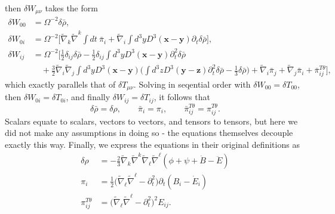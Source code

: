 \documentclass[10pt,letterpaper]{article}
\begin{document}
then $\delta W_{\mu\nu}$ takes the form
\begin{align}
\delta W_{00}  &= \Omega^{-2} \delta \bar \rho,
\nonumber\\	
\delta W_{0i} &= \Omega^{-2} \bigg[ \tilde\nabla_k \tilde\nabla^k \int dt\  \bar \pi_i  + \tilde\nabla_i  \int d^3y D^3(\mathbf x-\mathbf y) \partial_t \delta \bar\rho\bigg],
\nonumber\\	
\delta W_{ij}  &= \Omega^{-2}\bigg[ 
\frac12 \delta_{ij} \delta\bar \rho - \frac12 \delta_{ij} \int d^3y D^3(\mathbf x-\mathbf y) \partial_t^2 \delta \bar \rho \nonumber\\
&\quad +\frac32 \tilde\nabla_i\tilde\nabla_j \int d^3y D^3(\mathbf x-\mathbf y) \bigg( \int d^3z D^3(\mathbf y-\mathbf z) \partial_t^2 \delta \bar \rho - \frac13\delta\bar\rho\bigg)
+ \tilde\nabla_i \bar\pi_j + \tilde\nabla_j \bar\pi_i + \bar\pi_{ij}^{T\theta}\bigg],
\end{align}
which exactly parallels that of $\delta T_{\mu\nu}$. Solving in seqential order with $\delta W_{00} = \delta T_{00}$, then $\delta W_{0i} = \delta T_{0i}$, and finally $\delta W_{ij} = \delta T_{ij}$, it follows that
\begin{equation}
	\delta \bar \rho  = \delta \rho,\qquad \bar \pi_i = \pi_i,\qquad \bar \pi_{ij}^{T\theta} = \pi_{ij}^{T\theta}.
\end{equation}
Scalars equate to scalars, vectors to vectors, and tensors to tensors, but here we did not make any assumptions in doing so - the equations themselves decouple exactly this way. Finally, we express the equations in their original definitions as
\begin{align}
\delta \rho &=  -\frac{2}{3}\tilde{\nabla}_k\tilde{\nabla}^k\tilde{\nabla}_{\ell}\tilde{\nabla}^\ell(\phi + \psi +\dot{B}-\ddot{E})\nonumber\\
\pi_i &=  \frac12\big( \tilde\nabla_\ell \tilde\nabla^\ell - \partial_t^2\big) \partial_t (B_i - \dot{E}_i)\nonumber\\
\pi_{ij}^{T\theta} &=  \big(\tilde{\nabla}_\ell\tilde{\nabla}^\ell-\partial_t^2\big)^2E_{ij}.
\end{align}
\end{document}
